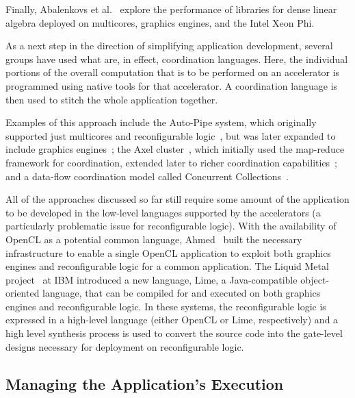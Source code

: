 Finally, Abalenkovs et al.~\cite{aad+15} explore the performance of
libraries for dense linear algebra deployed on multicores, graphics engines,
and the Intel Xeon Phi.

As a next step in the direction of simplifying application development,
several groups have used what are, in effect, coordination languages.
Here, the individual portions of the overall computation that is to be
performed on an accelerator is programmed using native tools for that
accelerator.  A coordination language is then used to stitch the whole
application together.

Examples of this approach include the Auto-Pipe system, which originally
supported just multicores and reconfigurable logic~\cite{ftb+06}, but was
later expanded to include graphics engines~\cite{cft+10};
the Axel cluster~\cite{tl10}, which initially used the map-reduce
framework for coordination,
extended later to richer coordination capabilities~\cite{ttpl10};
and a data-flow coordination model called Concurrent Collections~\cite{szb+12}.

All of the approaches discussed so far still require some amount of
the application to be developed in the low-level languages supported
by the accelerators (a particularly problematic issue for reconfigurable
logic).
With the availability of OpenCL as a potential common language,
Ahmed~\cite{Ahmed11} built the necessary infrastructure to enable
a single OpenCL application to exploit both graphics engines and
reconfigurable logic for a common application.
The Liquid Metal project~\cite{abb+12} at IBM introduced a new language,
Lime, a Java-compatible object-oriented language, that can be compiled
for and executed on both graphics engines and reconfigurable logic.
In these systems, the reconfigurable logic is expressed in a high-level
language (either OpenCL or Lime, respectively) and a high level
synthesis process is used to convert the source code into the gate-level
designs necessary for deployment on reconfigurable logic.


\subsection{Managing the Application's Execution}

